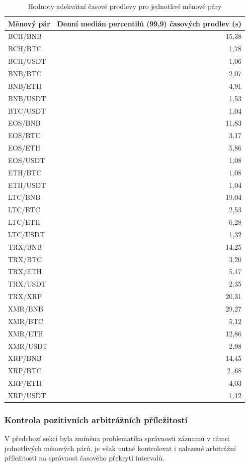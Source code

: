 \documentclass[thesis=B,czech]{FITthesis}[2019/03/21]
\begin{document}
\begin{table}\centering
\caption{Hodnoty adekvátní časové prodlevy pro jednotlivé měnové páry}
\label{tolerances}
\begin{tabular}{|| l | r ||}\hline Měnový pár & Denní medián percentilů (99,9) časových prodlev (s)\\ [0.5ex]
 \hline
  \hline BCH/BNB & 15,38 \\
  \hline BCH/BTC & 1,78 \\
  \hline BCH/USDT & 1,06 \\
  \hline BNB/BTC & 2,07 \\
  \hline BNB/ETH & 4,91 \\
  \hline BNB/USDT & 1,53 \\
  \hline BTC/USDT & 1,04 \\
  \hline EOS/BNB & 11,83 \\
  \hline EOS/BTC & 3,17 \\
  \hline EOS/ETH & 5,86 \\
  \hline EOS/USDT & 1,08 \\
  \hline ETH/BTC & 1,08 \\
  \hline ETH/USDT & 1,04 \\
  \hline LTC/BNB & 19,04 \\
  \hline LTC/BTC & 2,53 \\
  \hline LTC/ETH & 6,28 \\
  \hline LTC/USDT & 1,32 \\
  \hline TRX/BNB & 14,25 \\
  \hline TRX/BTC & 3,20 \\
  \hline TRX/ETH & 5,47 \\
  \hline TRX/USDT & 2,35 \\
  \hline TRX/XRP & 20,31 \\
  \hline XMR/BNB & 29,27 \\
  \hline XMR/BTC & 5,12 \\
  \hline XMR/ETH & 12,86 \\
  \hline XMR/USDT & 2,98 \\
  \hline XRP/BNB & 14,45 \\
  \hline XRP/BTC & 2.,68 \\
  \hline XRP/ETH & 4,03 \\
  \hline XRP/USDT & 1,12 \\
  \hline
\end{tabular}
\end{table}

\subsubsection{Kontrola pozitivních arbitrážních příležitostí}
\label{section:kontrola_pozitivnich_arbitraznich_prilezitosti}
V předchozí sekci byla zmíněna problematika správnosti záznamů v rámci jednotlivých měnových párů, je však nutné kontrolovat i nalezené arbitrážní příležitosti na správnost časového překrytí intervalů. 
\end{document}
